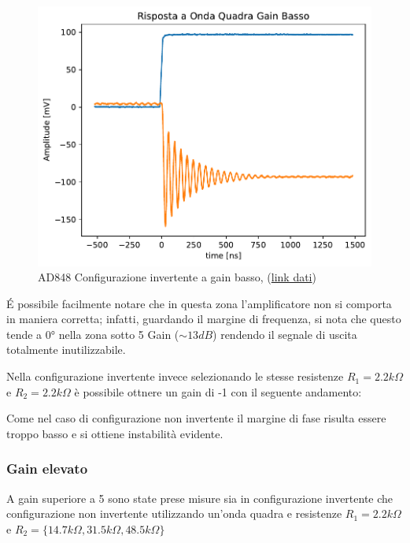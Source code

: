 \begin{figure}
    \centering
    \includegraphics[width=\linewidth]{assets/AD848/Invertente/Inv_low_gain.pdf}
    \caption{AD848 Configurazione invertente a gain basso, (\href{https://github.com/Yedi278/Esperimentazioni-Elettronica/tree/main/-\%20OPAMP/AD848/Invertente/R1\%202.2k\%20R2\%202.2k\%20Instabilit\%C3\%A0/Quadra}{link dati})}
\end{figure}

$$$$
\'E possibile facilmente notare che in questa zona l'amplificatore non si comporta in maniera corretta; infatti, guardando il margine di frequenza, si nota che questo tende a 0° nella zona sotto 5 Gain ($\sim 13 dB$) rendendo il segnale di uscita totalmente inutilizzabile.

Nella configurazione invertente invece selezionando le stesse resistenze $R_1 = 2.2k\Omega$ e $R_2 = 2.2k\Omega$ è possibile ottnere un gain di -1 con il seguente andamento:


Come nel caso di configurazione non invertente il margine di fase risulta essere troppo basso e si ottiene instabilità evidente.

\pagebreak
\subsubsection{Gain elevato}

A gain superiore a 5 sono state prese misure sia in configurazione invertente che configurazione non invertente utilizzando un'onda quadra e resistenze $R_1 = 2.2k\Omega$ e $R_2 = \{ 14.7k\Omega, 31.5k\Omega, 48.5k\Omega \}$

